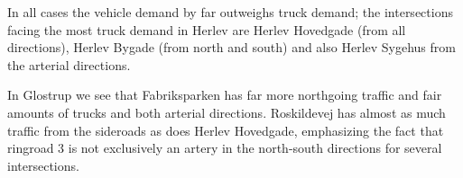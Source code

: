 In all cases the vehicle demand by far outweighs truck demand; the intersections facing the most truck demand in Herlev are Herlev Hovedgade (from all directions), Herlev Bygade (from north and south) and also Herlev Sygehus from the arterial directions. 

In Glostrup we see that Fabriksparken has far more northgoing traffic and fair amounts of trucks and both arterial directions. Roskildevej has almost as much traffic from the sideroads as does Herlev Hovedgade, emphasizing the fact that ringroad 3 is not exclusively an artery in the north-south directions for several intersections.
